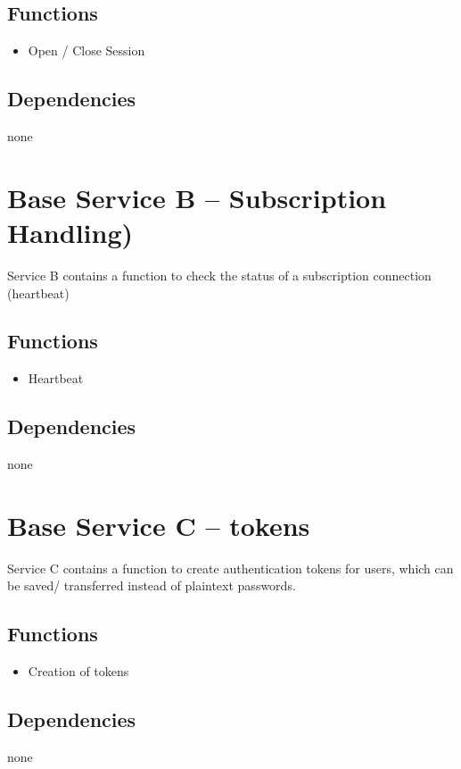 \subsection*{Functions}
\begin{itemize}
\item Open / Close Session
\end{itemize}

\subsection*{Dependencies}
none

\section{Base Service B -- Subscription Handling)}
\label{sec:Hierachiemodell:BasisdienstB}
Service B contains a function to check the status of a subscription connection (heartbeat)

\subsection*{Functions}
\begin{itemize}
\item Heartbeat
\end{itemize}

\subsection*{Dependencies}
none

\section{Base Service C -- tokens}
\label{sec:Hierachiemodell:BasisdienstC}
Service C contains a function to create authentication tokens for users, which can be saved/ transferred instead of plaintext passwords.

\subsection*{Functions}
\begin{itemize}
\item Creation of tokens
\end{itemize}

\subsection*{Dependencies}
none


